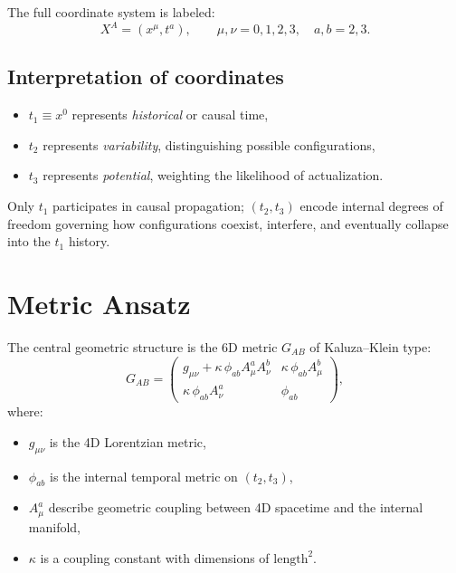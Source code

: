 \documentclass[12pt]{article}
\begin{document}
The full coordinate system is labeled:
\[
X^A = (x^\mu, t^a), \qquad
\mu,\nu = 0,1,2,3, \quad
a,b = 2,3.
\]

\subsection{Interpretation of coordinates}

\begin{itemize}
\item \(t_1 \equiv x^0\) represents \emph{historical} or causal time,
\item \(t_2\) represents \emph{variability}, distinguishing possible configurations,
\item \(t_3\) represents \emph{potential}, weighting the likelihood of 
actualization.
\end{itemize}

Only \(t_1\) participates in causal propagation; \((t_2,t_3)\) encode internal
degrees of freedom governing how configurations coexist, interfere, and
eventually collapse into the \(t_1\) history.


\newpage
\section{Metric Ansatz}

The central geometric structure is the 6D metric \(G_{AB}\) of Kaluza--Klein
type:
\begin{equation}
G_{AB} = 
\begin{pmatrix}
g_{\mu\nu} + \kappa\, \phi_{ab} A^a_\mu A^b_\nu 
    & \kappa\, \phi_{ab} A^b_\mu \\
\kappa\, \phi_{ab} A^a_\nu 
    & \phi_{ab}
\end{pmatrix},
\label{eq:6Dmetric-main}
\end{equation}
where:

\begin{itemize}
\item \(g_{\mu\nu}\) is the 4D Lorentzian metric,
\item \(\phi_{ab}\) is the internal temporal metric on \((t_2,t_3)\),
\item \(A^a_\mu\) describe geometric coupling between 4D spacetime and the
internal manifold,
\item \(\kappa\) is a coupling constant with dimensions of \(\text{length}^2\).
\end{itemize}
\end{document}
